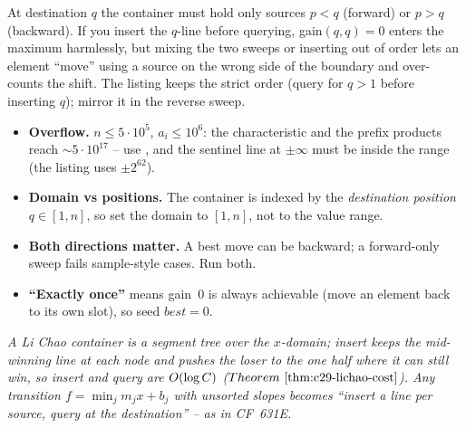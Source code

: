 \begin{warningbox}
At destination \(q\) the container must hold only sources \(p<q\) (forward) or
\(p>q\) (backward).  If you insert the \(q\)-line before querying, gain\((q,q)=0\)
enters the maximum harmlessly, but mixing the two sweeps or inserting out of order
lets an element ``move'' using a source on the wrong side of the boundary and
over-counts the shift.  The listing keeps the strict order (query for \(q>1\)
before inserting \(q\)); mirror it in the reverse sweep.
\end{warningbox}

\begin{hardeningbox}
\begin{itemize}[nosep,leftmargin=1.4em]
  \item \textbf{Overflow.} \(n\le5\cdot10^{5}\), \(a_i\le10^{6}\): the
        characteristic and the prefix products reach \(\sim5\cdot10^{17}\) -- use
        , and the sentinel line at \(\pm\infty\) must be inside
        the  range (the listing uses \(\pm2^{62}\)).
  \item \textbf{Domain vs positions.} The container is indexed by the
        \emph{destination position} \(q\in[1,n]\), so set the domain to \([1,n]\),
        not to the value range.
  \item \textbf{Both directions matter.} A best move can be backward; a forward-only
        sweep fails sample-style cases.  Run both.
  \item \textbf{``Exactly once'' } means gain~0 is always achievable (move an element
        back to its own slot), so seed \(\mathit{best}=0\).
\end{itemize}
\end{hardeningbox}

\begin{recallbox}
\emph{A Li Chao container is a segment tree over the \(x\)-domain; insert keeps
the mid-winning line at each node and pushes the loser to the one half where it
can still win, so insert and query are \(O(\log C)\) (\(\thmref{c29-lichao-cost}\)).
Any transition \(f=\min_j m_j x+b_j\) with unsorted slopes becomes ``insert a
line per source, query at the destination'' -- as in CF~631E.}
\end{recallbox}
